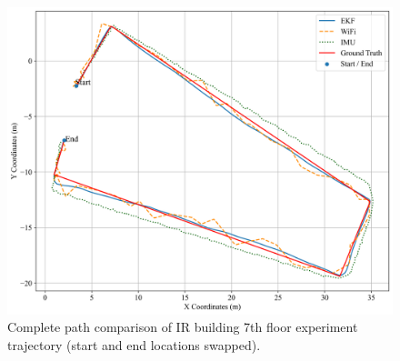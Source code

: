 \documentclass[12pt,a4paper]{article}
\numberwithin{equation}{section}
\begin{document}
\begin{figure}[H]
    \centering
    \includegraphics[width=0.8\linewidth]{images/1/0.png}
    \caption{Complete path comparison of IR building 7th floor experiment trajectory (start and end locations swapped).}
    \label{fig:Complete path comparison of IR building 7th floor experiment trajectory (start and end locations swapped)}
\end{figure}
\end{document}
